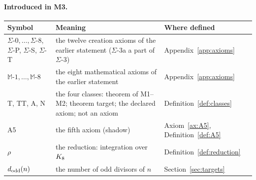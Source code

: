 \paragraph{Introduced in M3.}
\begin{center}\small
\begin{tabular}{@{}p{}p{}p{}@{}}
\toprule
Symbol & Meaning & Where defined \\
\midrule
$\Sigma$-$0,\dots,\Sigma$-$8$, $\Sigma$-P, $\Sigma$-S, $\Sigma$-T & the twelve creation axioms of the earlier statement ($\Sigma$-3a a part of $\Sigma$-3) & Appendix~\ref{app:axioms} \\
$\mathbb{M}$-$1,\dots,\mathbb{M}$-$8$ & the eight mathematical axioms of the earlier statement & Appendix~\ref{app:axioms} \\
T, TT, A, N & the four classes: theorem of M1--M2; theorem target; the declared axiom; not an axiom & Definition~\ref{def:classes} \\
A5 & the fifth axiom (shadow) & Axiom~\ref{ax:A5}, Definition~\ref{def:A5} \\
$\rho$ & the reduction: integration over $K_8$ & Definition~\ref{def:reduction} \\
$d_{\mathrm{odd}}(n)$ & the number of odd divisors of $n$ & Section~\ref{sec:targets} \\
\bottomrule
\end{tabular}
\end{center}
